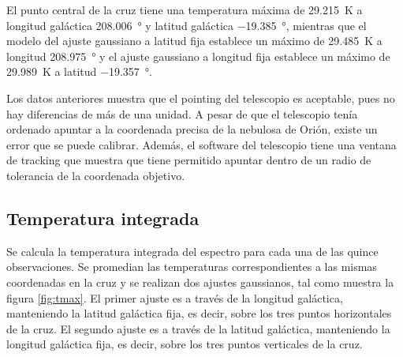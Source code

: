 El punto central de la cruz tiene una temperatura máxima de \SI{29.215}{\kelvin} a longitud galáctica \SI{208.006}{\degree} y latitud galáctica \SI{-19.385}{\degree}, mientras que el modelo del ajuste gaussiano a latitud fija establece un máximo de \SI{29.485}{\kelvin} a longitud \SI{208.975}{\degree} y el ajuste gaussiano a longitud fija establece un máximo de \SI{29.989}{\kelvin} a latitud \SI{-19.357}{\degree}.

Los datos anteriores muestra que el pointing del telescopio es aceptable, pues no hay diferencias de más de una unidad. A pesar de que el telescopio tenía ordenado apuntar a la coordenada precisa de la nebulosa de Orión, existe un error que se puede calibrar. Además, el software del telescopio tiene una ventana de tracking que muestra que tiene permitido apuntar dentro de un radio de tolerancia de la coordenada objetivo.

\subsection{Temperatura integrada}

Se calcula la temperatura integrada del espectro para cada una de las quince observaciones. Se promedian las temperaturas correspondientes a las mismas coordenadas en la cruz y se realizan dos ajustes gaussianos, tal como muestra la figura \ref{fig:tmax}. El primer ajuste es a través de la longitud galáctica, manteniendo la latitud galáctica fija, es decir, sobre los tres puntos horizontales de la cruz. El segundo ajuste es a través de la latitud galáctica, manteniendo la longitud galáctica fija, es decir, sobre los tres puntos verticales de la cruz.

